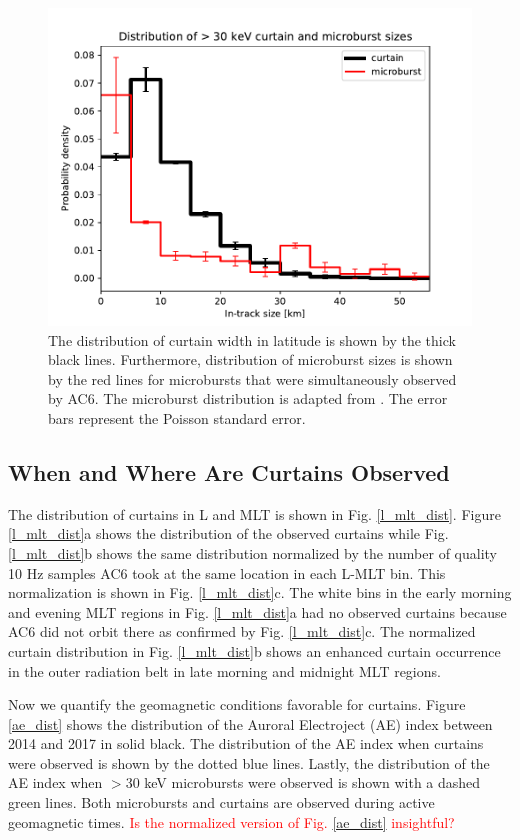\documentclass[draft]{agujournal2019}
\begin{document}
\begin{figure}
\includegraphics[width=\textwidth]{ac6_curtain_microburst_width_dist.pdf}
\caption{The distribution of curtain width in latitude is shown by the thick black lines. Furthermore, distribution of microburst sizes is shown by the red lines for microbursts that were simultaneously observed by AC6. The microburst distribution is adapted from . The error bars represent the Poisson standard error.}
\label{width_dist}
\end{figure}

\subsection{When and Where Are Curtains Observed}
The distribution of curtains in L and MLT is shown in Fig. \ref{l_mlt_dist}. Figure \ref{l_mlt_dist}a shows the distribution of the observed curtains while Fig. \ref{l_mlt_dist}b shows the same distribution normalized by the number of quality 10 Hz samples AC6 took at the same location in each L-MLT bin. This normalization is shown in Fig. \ref{l_mlt_dist}c. The white bins in the early morning and evening MLT regions in Fig. \ref{l_mlt_dist}a had no observed curtains because AC6 did not orbit there as confirmed by Fig. \ref{l_mlt_dist}c. The normalized curtain distribution in Fig. \ref{l_mlt_dist}b shows an enhanced curtain occurrence in the outer radiation belt in late morning and midnight MLT regions.

Now we quantify the geomagnetic conditions favorable for curtains. Figure \ref{ae_dist} shows the distribution of the Auroral Electroject (AE) index between 2014 and 2017 in solid black. The distribution of the AE index when curtains were observed is shown by the dotted blue lines. Lastly, the distribution of the AE index when $> 30$ keV microbursts were observed is shown with a dashed green lines. Both microbursts and curtains are observed during active geomagnetic times. \textcolor{red}{Is the normalized version of Fig. \ref{ae_dist} insightful?}
\end{document}
